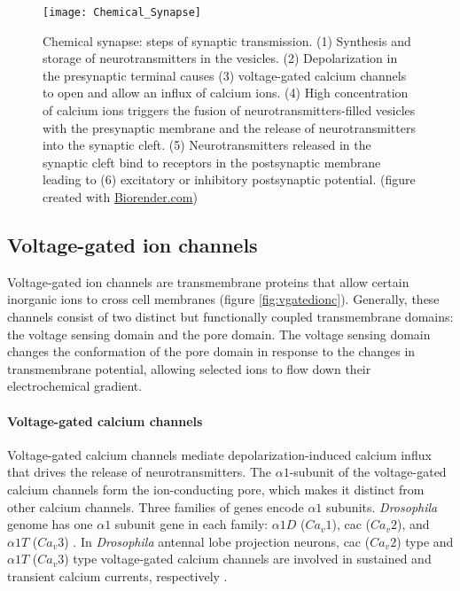 \begin{figure}
\centering
\hspace*{-1cm} 
\texttt{[image: Chemical\_Synapse]}
\caption[Chemical synapse: steps of synaptic transmission] {Chemical synapse: steps of synaptic transmission. (1) Synthesis and storage of neurotransmitters in the vesicles. (2) Depolarization in the presynaptic terminal causes (3) voltage-gated calcium channels to open and allow an influx of calcium ions. (4) High concentration of calcium ions triggers the fusion of neurotransmitters-filled vesicles with the presynaptic membrane and the release of neurotransmitters into the synaptic cleft. (5) Neurotransmitters released in the synaptic cleft bind to receptors in the postsynaptic membrane leading to (6) excitatory or inhibitory postsynaptic potential. (figure created with \href{https://app.biorender.com/biorender-templates}{Biorender.com})}
\label{fig:chemicalsynapse}
\end{figure}

\subsection{Voltage-gated ion channels}
Voltage-gated ion channels are transmembrane proteins that allow certain inorganic ions to cross cell membranes (figure  \ref{fig:vgatedionc}). Generally, these channels consist of two distinct but functionally coupled transmembrane domains: the voltage sensing domain and the pore domain. The voltage sensing domain changes the conformation of the pore domain in response to the changes in transmembrane potential, allowing selected ions to flow down their electrochemical gradient. 

\paragraph{Voltage-gated calcium channels}
Voltage-gated calcium channels mediate depolarization-induced calcium influx that drives the release of neurotransmitters. The $\alpha1$-subunit of the voltage-gated calcium channels form the ion-conducting pore, which makes it distinct from other calcium channels. Three families of genes encode $\alpha1$ subunits. \textit{Drosophila} genome has one $\alpha1$ subunit gene in each family: $\alpha1D$ ($Ca_{v}1$), cac ($Ca_{v}2$), and $\alpha1T$ ($Ca_{v}3$) \parencite{Littleton2000, King2007}. In \textit{Drosophila} antennal lobe projection neurons, cac ($Ca_{v}2$) type and $\alpha1T$ ($Ca_{v}3$) type voltage-gated calcium channels are involved in sustained and transient calcium currents, respectively \parencite{Gu2009, Iniguez2013}.

